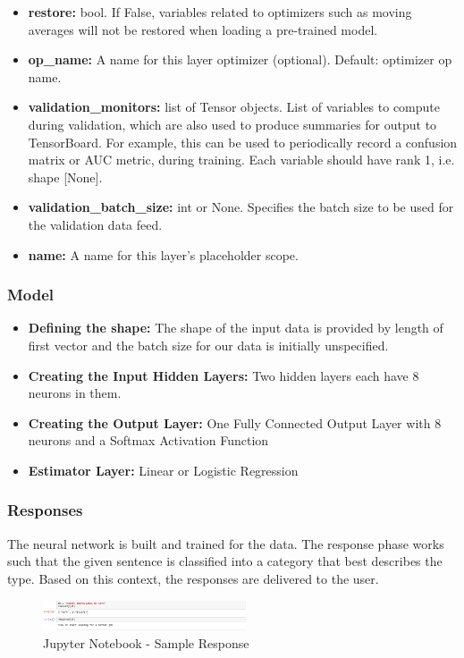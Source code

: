 \documentclass[conference,compsoc]{IEEEtran}
\begin{document}
\begin{itemize}
    \item \textbf{restore:} bool. If False, variables related to optimizers such as moving averages will not be restored when loading a pre-trained model.
    \item \textbf{op\_name:} A name for this layer optimizer (optional). Default: optimizer op name.
    \item \textbf{validation\_monitors:} list of Tensor objects. List of variables to compute during validation, which are also used to produce summaries for output to TensorBoard. For example, this can be used to periodically record a confusion matrix or AUC metric, during training. Each variable should have rank 1, i.e. shape [None].
    \item \textbf{validation\_batch\_size:} int or None. Specifies the batch size to be used for the validation data feed.
    \item \textbf{name:} A name for this layer's placeholder scope.    
\end{itemize}

\subsubsection{Model}

\begin{itemize}
    \item \textbf{Defining the shape:} The shape of the input data is provided by length of first vector and  the batch size for our data is initially unspecified.
    \item \textbf{Creating the Input Hidden Layers:} Two hidden layers each have 8 neurons in them.
    \item \textbf{Creating the Output Layer:} One Fully Connected Output Layer with 8 neurons and a Softmax Activation Function
    \item \textbf{Estimator Layer:} Linear or Logistic Regression    
\end{itemize}

\subsubsection{Responses}

The neural network is built and trained for the data. The response phase works such that the given sentence is classified into a category that best describes the type. Based on this context, the responses are delivered to the user.

\begin{figure}[H]
    \centering
    \includegraphics[width=6cm]{screenshots/jupyter-notebook/response.png}
    \caption{Jupyter Notebook - Sample Response}
\end{figure}
\end{document}
